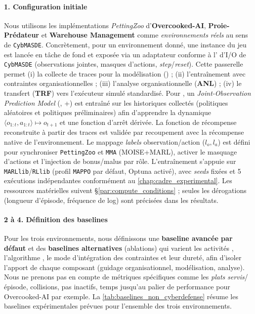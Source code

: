 \paragraph{1. Configuration initiale}

Nous utilisons les implémentations \emph{PettingZoo} d’\textbf{Overcooked-AI}, \textbf{Proie-Prédateur} et \textbf{Warehouse Management} comme \emph{environnements réels} au sens de \texttt{CybMASDE}. Concrètement, pour un environnement donné, une instance du jeu est lancée en tâche de fond et exposée via un adaptateur  conforme à l’ d’I/O de \texttt{CybMASDE} (observations jointes, masques d’actions, \emph{step}/\emph{reset}). Cette passerelle permet (i) la collecte de traces pour la modélisation (\texttt{}) ; (ii) l’entraînement  avec contraintes organisationnelles ; (iii) l’analyse organisationnelle (\textbf{ANL}) ; (iv) le transfert (\textbf{TRF}) vers l’exécuteur simulé standardisé.
Pour \texttt{}, un \emph{Joint-Observation Prediction Model} (, +) est entraîné sur les historiques collectés (politiques aléatoires et politiques préliminaires) afin d’apprendre la dynamique $\langle o_{1:t},a_{1:t} \rangle \mapsto o_{t+1}$ et une fonction d’arrêt dérivée. La fonction de récompense reconstruite à partir des traces est validée par recoupement avec la récompense native de l'environnement. Le mappage \emph{labels} observation/action ($l_o, l_a$) est défini pour synchroniser \texttt{PettingZoo} et \texttt{MMA} (MOISE+MARL), activer le masquage d’actions et l’injection de bonus/malus par rôle. L’entraînement s’appuie sur \texttt{MARLlib}/\texttt{RLlib} (profil \texttt{MAPPO} par défaut, Optuna activé), avec \textit{seeds} fixées et 5 exécutions indépendantes conformément au \autoref{chap:cadre_experimental}. Les ressources matérielles suivent \S\ref{par:compute_conditions} ; seules les dérogations (longueur d’épisode, fréquence de log) sont précisées dans les résultats.

\paragraph{2 à 4. Définition des baselines}

Pour les trois environnements, nous définissons une \textbf{baseline avancée par défaut} et des \textbf{baselines alternatives} (ablations) qui varient les activités , l’algorithme , le mode d’intégration des contraintes et leur dureté, afin d’isoler l’apport de chaque composant (guidage organisationnel, modélisation, analyse). Nous ne prenons pas en compte de métriques spécifiques comme les \emph{plats servis}/épisode, collisions, pas inactifs, temps jusqu’au palier de performance pour Overcooked-AI par exemple. La \autoref{tab:baselines_non_cyberdefense} résume les baselines expérimentales prévues pour l'ensemble des trois environnements.


